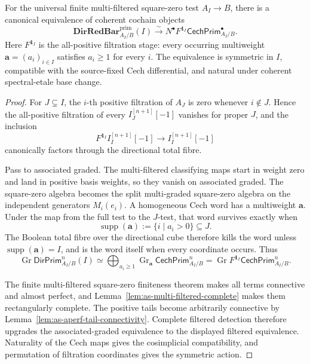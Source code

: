\begin{theorem}
\label{thm:as-support-multiweight-identification}
For the universal finite multi-filtered square-zero test $A_I\to B$, there is
a canonical equivalence of coherent cochain objects
\[
\boxed{
    \mathbf{DirRedBar}^{\mathrm{prim}}_{A_I/B}(I)
    \xrightarrow{\sim}
    N^\bullet
    F^{\mathbf1_I}
    \mathsf{CechPrim}^{\bullet}_{A_I/B}.
}
\]
Here $F^{\mathbf1_I}$ is the all-positive filtration stage: every occurring
multiweight $\mathbf a=(a_i)_{i\in I}$ satisfies $a_i\geq1$ for every $i$.
The equivalence is symmetric in $I$, compatible with the source-fixed Cech
differential, and natural under coherent spectral-etale base change.
\end{theorem}

\begin{proof}
For $J\subsetneq I$, the $i$-th positive filtration of $A_J$ is zero whenever
$i\notin J$.  Hence the all-positive filtration of every
$I_J^{[n+1]}[-1]$ vanishes for proper $J$, and the inclusion
\[
    F^{\mathbf1_I}I_I^{[n+1]}[-1]
    \longrightarrow
    I_I^{[n+1]}[-1]
\]
canonically factors through the directional total fibre.

Pass to associated graded.  The multi-filtered classifying maps start in
weight zero and land in positive basis weights, so they vanish on associated
graded.  The square-zero algebra becomes the split multi-graded square-zero
algebra on the independent generators $M_i(e_i)$.  A homogeneous Cech word
has a multiweight $\mathbf a$.  Under the map from the full test to the
$J$-test, that word survives exactly when
\[
    \operatorname{supp}(\mathbf a)
    :=\{i\mid a_i>0\}
    \subseteq J.
\]
The Boolean total fibre over the directional cube therefore kills the word
unless $\operatorname{supp}(\mathbf a)=I$, and is the word itself when every
coordinate occurs.  Thus
\[
    \operatorname{Gr}
    \mathsf{DirPrim}_{A_I/B}^{n}(I)
    \simeq
    \bigoplus_{a_i\geq1}
    \operatorname{Gr}_{\mathbf a}
    \mathsf{CechPrim}_{A_I/B}^{n}
    =
    \operatorname{Gr}
    F^{\mathbf1_I}
    \mathsf{CechPrim}_{A_I/B}^{n}.
\]

The finite multi-filtered square-zero finiteness theorem makes all terms
connective and almost perfect, and
Lemma~\ref{lem:as-multi-filtered-complete} makes them rectangularly complete.
The positive tails become arbitrarily connective by
Lemma~\ref{lem:as-aperf-tail-connectivity}.  Complete filtered detection
therefore upgrades the associated-graded equivalence to the displayed
filtered equivalence.  Naturality of the Cech maps gives the cosimplicial
compatibility, and permutation of filtration coordinates gives the symmetric
action.
\end{proof}

